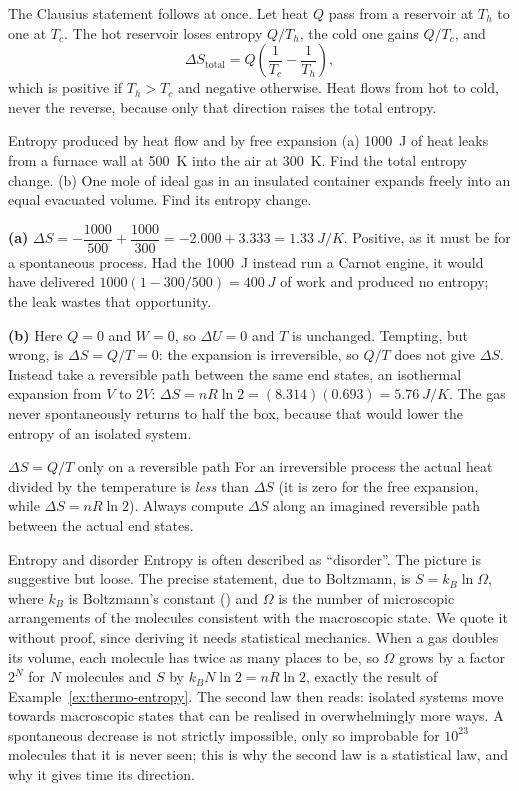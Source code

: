 The Clausius statement follows at once. Let heat $Q$ pass from a reservoir at $T_h$ to one at $T_c$. The
hot reservoir loses entropy $Q/T_h$, the cold one gains $Q/T_c$, and
\[
\Delta S_{\text{total}}=Q\left(\frac{1}{T_c}-\frac{1}{T_h}\right),
\]
which is positive if $T_h>T_c$ and negative otherwise. Heat flows from hot to cold, never the reverse,
because only that direction raises the total entropy.

\begin{exbox}{Entropy produced by heat flow and by free expansion}\label{ex:thermo-entropy}
(a) \SI{1000}{J} of heat leaks from a furnace wall at \SI{500}{K} into the air at \SI{300}{K}. Find the
total entropy change. (b) One mole of ideal gas in an insulated container expands freely into an equal
evacuated volume. Find its entropy change.

 \textbf{(a)} $\Delta S=-\dfrac{1000}{500}+\dfrac{1000}{300}=-2.000+3.333=\SI{+1.33}{J/K}$. Positive,
as it must be for a spontaneous process. Had the \SI{1000}{J} instead run a Carnot engine, it would have
delivered $1000(1-300/500)=\SI{400}{J}$ of work and produced no entropy; the leak wastes that opportunity.

 \textbf{(b)} Here $Q=0$ and $W=0$, so $\Delta U=0$ and $T$ is unchanged. Tempting, but wrong, is
$\Delta S=Q/T=0$: the expansion is irreversible, so $Q/T$ does not give $\Delta S$. Instead take a reversible
path between the same end states, an isothermal expansion from $V$ to $2V$:
$\Delta S=nR\ln2=(8.314)(0.693)=\SI{+5.76}{J/K}$. The gas never spontaneously returns to half the box,
because that would lower the entropy of an isolated system.
\end{exbox}

\begin{trapbox}{$\Delta S=Q/T$ only on a reversible path}
For an irreversible process the actual heat divided by the temperature is \emph{less} than $\Delta S$ (it
is zero for the free expansion, while $\Delta S=nR\ln2$). Always compute $\Delta S$ along an imagined
reversible path between the actual end states.
\end{trapbox}

\begin{remarkbox}{Entropy and disorder}
Entropy is often described as ``disorder''. The picture is suggestive but loose. The precise statement,
due to Boltzmann, is $S=k_B\ln\Omega$, where $k_B$ is Boltzmann's constant () and
$\Omega$ is the number of microscopic arrangements of the molecules consistent with the macroscopic state.
We quote it without proof, since deriving it needs statistical mechanics. When a gas doubles its
volume, each molecule has twice as many places to be, so $\Omega$ grows by a factor $2^{N}$ for $N$
molecules and $S$ by $k_BN\ln2=nR\ln2$, exactly the result of Example~\ref{ex:thermo-entropy}. The second law
then reads: isolated systems move towards macroscopic states that can be realised in overwhelmingly more
ways. A spontaneous decrease is not strictly impossible, only so improbable for $10^{23}$ molecules that
it is never seen; this is why the second law is a statistical law, and why it gives time its direction.
\end{remarkbox}

